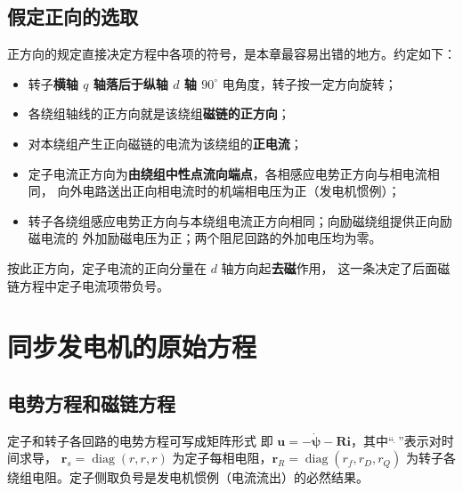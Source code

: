 \subsection{假定正向的选取}

正方向的规定直接决定方程中各项的符号，是本章最容易出错的地方。约定如下：
\begin{itemize}
  \item 转子\textbf{横轴 $q$ 轴落后于纵轴 $d$ 轴 $90^\circ$} 电角度，转子按一定方向旋转；
  \item 各绕组轴线的正方向就是该绕组\textbf{磁链的正方向}；
  \item 对本绕组产生正向磁链的电流为该绕组的\textbf{正电流}；
  \item 定子电流正方向为\textbf{由绕组中性点流向端点}，各相感应电势正方向与相电流相同，
        向外电路送出正向相电流时的机端相电压为正（发电机惯例）；
  \item 转子各绕组感应电势正方向与本绕组电流正方向相同；向励磁绕组提供正向励磁电流的
        外加励磁电压为正；两个阻尼回路的外加电压均为零。
\end{itemize}

按此正方向，定子电流的正向分量在 $d$ 轴方向起\textbf{去磁}作用，
这一条决定了后面磁链方程中定子电流项带负号。

\section{同步发电机的原始方程}

\subsection{电势方程和磁链方程}

定子和转子各回路的电势方程可写成矩阵形式
即 $\boldsymbol u=-\dot{\boldsymbol\psi}-\boldsymbol R\boldsymbol i$，其中“$\,\dot{}\,$”表示对时间求导，
$\boldsymbol r_s=\operatorname{diag}(r,r,r)$ 为定子每相电阻，$\boldsymbol r_R=\operatorname{diag}(r_f,r_D,r_Q)$
为转子各绕组电阻。定子侧取负号是发电机惯例（电流流出）的必然结果。

